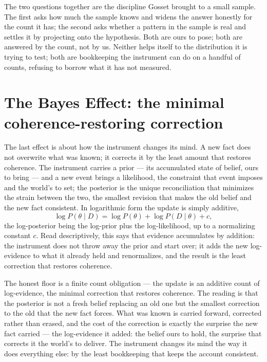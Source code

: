 The two questions together are the discipline Gosset brought to a small sample. The first asks how much the
sample knows and widens the answer honestly for the count it has; the second asks whether a pattern in the
sample is real and settles it by projecting onto the hypothesis. Both are ours to pose; both are answered by
the count, not by us. Neither helps itself to the distribution it
is trying to test; both are bookkeeping the instrument can do on a handful of counts, refusing to borrow what
it has not measured.

\section{The Bayes Effect: the minimal coherence-restoring correction}
\label{se:bayes}

The last effect is about how the instrument changes its mind. A new fact does not overwrite what was known;
it corrects it by the least amount that restores coherence. The instrument carries a prior --- its accumulated
state of belief, ours to bring --- and a new event brings a likelihood, the constraint that event imposes and
the world's to set; the posterior is the unique reconciliation that minimizes the strain between the two, the
smallest revision that makes the old belief and the new fact consistent. In logarithmic form the update is simply additive,
\begin{equation}
  \log P(\theta \mid D) = \log P(\theta) + \log P(D \mid \theta) + c,
\end{equation}
the log-posterior being the log-prior plus the log-likelihood, up to a normalizing constant $c$. Read
descriptively, this says that evidence accumulates by addition: the instrument does not throw away the prior
and start over; it adds the new log-evidence to what it already held and renormalizes, and the result is the
least correction that restores coherence.

The honest floor is a finite count obligation --- the update is an additive count of log-evidence, the
minimal correction that restores coherence. The reading is that the posterior is not a fresh belief replacing
an old one but the smallest correction to the old that the new fact forces. What was known is carried forward,
corrected rather than erased, and the cost of the correction is exactly the surprise the new fact carried ---
the log-evidence it added: the belief ours to hold, the surprise that corrects it the world's to deliver. The instrument changes its mind the way it does everything else: by the least
bookkeeping that keeps the account consistent.

